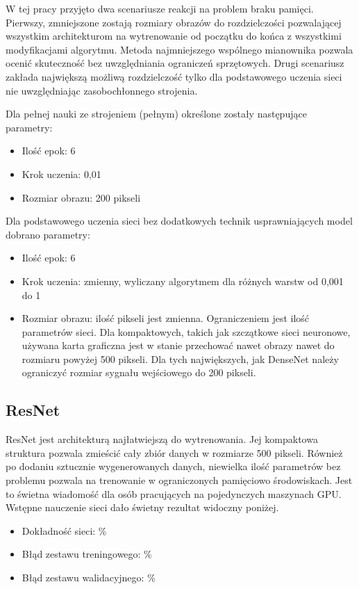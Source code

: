 \documentclass[12pt,a4paper,twoside,titlepage,openright]{book}
\begin{document}
W tej pracy przyjęto dwa scenariusze reakcji na problem braku pamięci. Pierwszy, zmniejszone zostają rozmiary obrazów do rozdzielczości pozwalającej wszystkim architekturom na wytrenowanie od początku do końca z wszystkimi modyfikacjami algorytmu. Metoda najmniejszego wspólnego mianownika pozwala ocenić skuteczność bez uwzględniania ograniczeń sprzętowych. Drugi scenariusz zakłada największą możliwą rozdzielczość tylko dla podstawowego uczenia sieci nie uwzględniając zasobochłonnego strojenia.

Dla pełnej nauki ze strojeniem (pełnym) określone zostały następujące parametry:
\begin{itemize}
\item Ilość epok: 6
\item Krok uczenia: 0,01
\item Rozmiar obrazu: 200 pikseli
\end{itemize}

Dla podstawowego uczenia sieci bez dodatkowych technik usprawniających model dobrano parametry:
\begin{itemize}
\item Ilość epok: 6
\item Krok uczenia: zmienny, wyliczany algorytmem dla różnych warstw od 0,001 do 1 
\item Rozmiar obrazu: ilość pikseli jest zmienna. Ograniczeniem jest ilość parametrów sieci. Dla kompaktowych, takich jak szczątkowe sieci neuronowe, używana karta graficzna jest w stanie przechować nawet obrazy nawet do rozmiaru powyżej 500 pikseli. Dla tych największych, jak DenseNet należy ograniczyć rozmiar sygnału wejściowego do 200 pikseli.
\end{itemize}

\subsection{ResNet} %
ResNet jest architekturą najłatwiejszą do wytrenowania. Jej kompaktowa struktura pozwala zmieścić cały zbiór danych w rozmiarze 500 pikseli. Również po dodaniu sztucznie wygenerowanych danych, niewielka ilość parametrów bez problemu pozwala na trenowanie w ograniczonych pamięciowo środowiskach. Jest to świetna wiadomość dla osób pracujących na pojedynczych maszynach GPU. Wstępne nauczenie sieci dało świetny rezultat widoczny poniżej.
\begin{itemize}
\item Dokładność sieci: \%
\item Błąd zestawu treningowego: \%
\item Błąd zestawu walidacyjnego: \%
\end{itemize}
\end{document}
